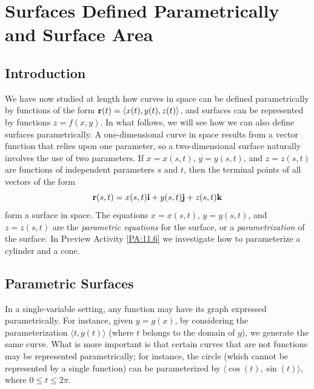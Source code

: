 \section{Surfaces Defined Parametrically and Surface Area} \label{S:11.6.Parametric_Surfaces_Surface_Area}

\vspace*{-14 pt}


\subsection*{Introduction}

We have now studied at length how curves in space can be defined parametrically by functions of the form $\mathbf{r}(t) = \langle x(t), y(t), z(t) \rangle$, and surfaces can be represented by functions $z = f(x,y)$.  In what follows, we will see how we can also define surfaces parametrically.  A one-dimensional curve in space results from a vector function that relies upon one parameter, so a two-dimensional surface naturally involves the use of two parameters.  If $x = x(s, t)$, $y = y(s, t)$, and $z = z(s, t)$ are functions of independent parameters $s$ and $t$, then the terminal points of all vectors of the form
\[\mathbf{r}(s, t) = x(s, t) \mathbf{i} + y(s, t) \mathbf{j} + z(s, t) \mathbf{k}\]
form a surface in space. The equations $x=x(s,t)$, $y=y(s,t)$, and $z=z(s,t)$ are the \emph{parametric equations} for the surface, or a \emph{parametrization} of the surface. In Preview Activity \ref{PA:11.6} we investigate how to parameterize a cylinder and a cone. 



\subsection*{Parametric Surfaces}

%
In a single-variable setting, any function may have its graph expressed parametrically.  For instance, given $y = g(x)$, by considering the parameterization $\langle t, g(t) \rangle$ (where $t$ belongs to the domain of $g$), we generate the same curve.  What is more important is that certain curves that are not functions may be represented parametrically; for instance, the circle (which cannot be represented by a single function) can be parameterized by $\langle \cos(t), \sin(t) \rangle$, where $0 \le t \le 2\pi$.

